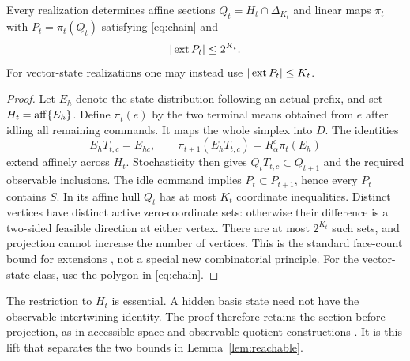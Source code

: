 \begin{lemma}\label{lem:reachable}
Every realization determines affine sections
$Q_t=H_t\cap\Delta_{K_t}$ and linear maps $\pi_t$ with
$P_t=\pi_t(Q_t)$ satisfying \eqref{eq:chain} and
\begin{equation}\label{eq:face-count}
                         |\operatorname{ext} P_t|\le2^{K_t}.
\end{equation}
For vector-state realizations one may instead use $|\operatorname{ext} P_t|\le K_t$.
\end{lemma}
\begin{proof}
Let $E_h$ denote the state distribution following an actual prefix, and
set $H_t=\operatorname{aff}\{E_h\}$. Define $\pi_t(e)$ by the two terminal means
obtained from $e$ after idling all remaining commands. It maps the whole
simplex into $D$. The identities
\[
 E_hT_{t,c}=E_{hc},\qquad
 \pi_{t+1}(E_hT_{t,c})=R_\alpha^c\pi_t(E_h)
\]
extend affinely across $H_t$. Stochasticity then gives
$Q_tT_{t,c}\subset Q_{t+1}$ and the required observable inclusions.
The idle command implies $P_t\subset P_{t+1}$, hence every $P_t$
contains $S$.
In its affine hull $Q_t$ has at most $K_t$ coordinate inequalities.
Distinct vertices have distinct active zero-coordinate sets: otherwise
their difference is a two-sided feasible direction at either vertex.
There are at most $2^{K_t}$ such sets, and projection cannot increase
the number of vertices. This is the standard face-count bound for
extensions \cite{FRT}, not a special new combinatorial principle.
For the vector-state class, use the polygon in \eqref{eq:chain}.
\end{proof}

The restriction to $H_t$ is essential. A hidden basis state need not have
the observable intertwining identity. The proof therefore retains the
section before projection, as in accessible-space and observable-quotient
constructions \cite{BF04,MW}. It is this lift that separates the two
bounds in Lemma~\ref{lem:reachable}.

